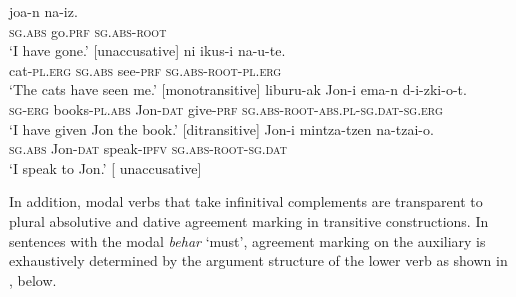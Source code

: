 \documentclass[output=paper]{langscibook}
\begin{document}
\ea \label{ex:haddican:20}\label{agreement}
    \ea {} {joa-n} {na-iz.}\\	
              \textsc{sg.abs} go.\textsc{prf} \textsc{sg.abs-root}\\
 	    \glt  `I have gone.'  \hfill{[unaccusative]}
    \ex {} {ni} {ikus-i} {na-u-te.}\\	
 	      cat-\textsc{pl.erg} \textsc{sg.abs} see-\textsc{prf} \textsc{sg.abs-root}-\textsc{pl.erg}\\
        \glt    `The cats have seen me.' \hfill{[monotransitive]}
    \ex {} {liburu-ak} {Jon-i} {ema-n} {d-i-zki-o-t.}\\	
          \textsc{sg-erg} books-\textsc{pl.abs} Jon-\textsc{dat} give-\textsc{prf} \textsc{sg.abs-root-abs.pl}-\textsc{sg.dat}-\textsc{sg.erg} \\
        \glt `I have given Jon the book.'  \hfill{[ditransitive]}
    \ex {} {Jon-i} {mintza-tzen} {na-tzai-o.}\\	
 		\textsc{sg.abs} Jon-\textsc{dat} speak-\textsc{ipfv} \textsc{sg.abs-root}-\textsc{sg.dat}   \\
 		\glt `I speak to Jon.'   \hfill{[ unaccusative]}
\z\z

In addition, modal verbs that take infinitival complements are transparent to plural absolutive and dative agreement marking in transitive constructions.  In sentences with the modal \textit{behar} `must',  agreement marking on the auxiliary is exhaustively determined by the argument structure of the lower verb as shown in , below.  

\ea \label{ex:haddican:21}
\z\z
{}  
 
\end{document}
